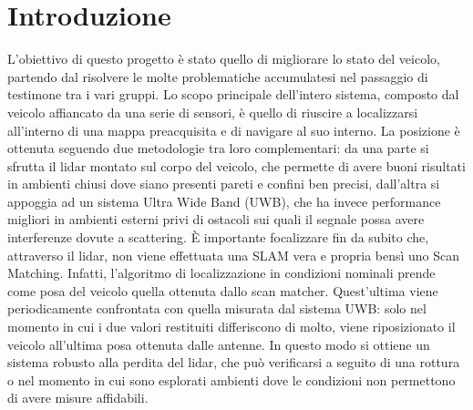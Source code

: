 
\section*{Introduzione}
L'obiettivo di questo progetto \`e stato quello di migliorare lo stato del veicolo, partendo dal risolvere le molte problematiche accumulatesi nel passaggio di testimone tra i vari gruppi.
Lo scopo principale dell'intero sistema, composto dal veicolo affiancato da una serie di sensori, \`e quello di riuscire a localizzarsi all'interno di una mappa preacquisita e di navigare al suo interno.
La posizione \`e ottenuta seguendo due metodologie tra loro complementari: da una parte si sfrutta il lidar montato sul corpo del veicolo, che permette di avere buoni risultati in ambienti chiusi dove siano presenti pareti e confini ben precisi, dall'altra si appoggia ad un sistema Ultra Wide Band (UWB), che ha invece performance migliori in ambienti esterni privi di ostacoli sui quali il segnale possa avere interferenze dovute a scattering.
\`E importante focalizzare fin da subito che, attraverso il lidar, non viene effettuata una SLAM vera e propria bens\`i uno Scan Matching.
Infatti, l'algoritmo di localizzazione in condizioni nominali prende come posa del veicolo quella ottenuta dallo scan matcher. 
Quest'ultima viene periodicamente confrontata con quella misurata dal sistema UWB: solo nel momento in cui i due valori restituiti differiscono di molto, viene riposizionato il veicolo all'ultima posa ottenuta dalle antenne.
In questo modo si ottiene un sistema robusto alla perdita del lidar, che pu\`o verificarsi a seguito di una rottura o nel momento in cui sono esplorati ambienti dove le condizioni non permettono di avere misure affidabili.
